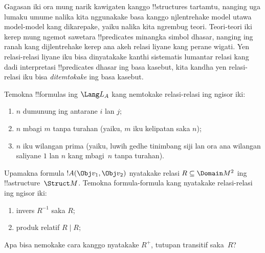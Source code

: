 \documentclass[../../../include/open-logic-section]{subfiles}
\begin{document}
\begin{explain}
Gagasan iki ora mung narik kawigaten kanggo
!!{structure}s tartamtu, nanging uga lumaku
umume nalika kita nggunakake basa kanggo
njlentrehake model utawa model-model kang
dikarepake, yaiku nalika kita ngrembug teori.
Teori-teori iki kerep mung ngemot sawetara
!!{predicate}s minangka simbol dhasar, nanging
ing ranah kang dijlentrehake kerep ana akeh
relasi liyane kang perane wigati. Yen relasi-relasi
liyane iku bisa dinyatakake kanthi sistematis
lumantar relasi kang dadi interpretasi
!!{predicate}s dhasar ing basa kasebut,
kita kandha yen relasi-relasi iku bisa
\emph{ditemtokake} ing basa kasebut.
\end{explain}

\begin{prob}
Temokna !!{formula}s ing $\Lang L_A$ kang
nemtokake relasi-relasi ing ngisor iki:
\begin{enumerate}
\item $n$ dumunung ing antarane $i$ lan $j$;
\item $n$ mbagi $m$ tanpa turahan (yaiku, $m$
  iku kelipatan saka $n$);
\item $n$ iku wilangan prima (yaiku, luwih gedhe tinimbang siji lan ora ana
  wilangan saliyane $1$ lan $n$ kang mbagi~$n$
  tanpa turahan).
\end{enumerate}
\end{prob}

\begin{prob}
Upamakna formula $!A(\Obj v_1, \Obj v_2)$
nyatakake relasi $R
\subseteq \Domain M^2$ ing
!!a{structure}~$\Struct M$. Temokna formula-formula
kang nyatakake relasi-relasi ing ngisor iki:
\begin{enumerate}
\item invers $R^{-1}$ saka $R$;
\item produk relatif $R \mid R$;
\end{enumerate}
Apa bisa nemokake cara kanggo nyatakake $R^+$,
tutupan transitif saka~$R$?
\end{prob}
\end{document}
